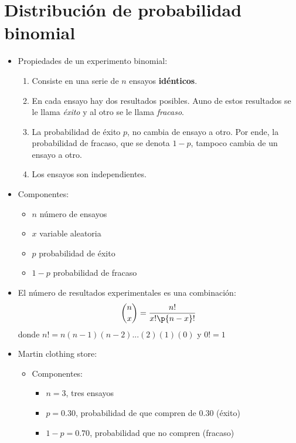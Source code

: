 \documentclass{article}
\begin{document}
\section{Distribución de probabilidad binomial}
\begin{itemize}
    \item Propiedades de un experimento binomial:
        \begin{enumerate}
            \item Consiste en una serie de $n$ ensayos \textbf{idénticos}.
            \item En cada ensayo hay dos resultados posibles. Auno de estos resultados se le llama \emph{éxito} y al otro se le llama \emph{fracaso}.
            \item La probabilidad de éxito $p$, no cambia de ensayo a otro. Por ende, la probabilidad de fracaso, que se denota $1-p$, tampoco cambia de un ensayo a otro. 
            \item Los ensayos son independientes. 
        \end{enumerate}
    
    \item Componentes:
        \begin{itemize}
            \item $n$ número de ensayos 
            \item $x$ variable aleatoria 
            \item $p$ probabilidad de éxito 
            \item $1-p$ probabilidad de fracaso 
        \end{itemize}
    
    \item El número de resultados experimentales es una combinación:
        \[
          \binom{n}{x} = \frac{n!}{x!\p{n-x} !} 
        \] donde $n! = n(n-1)(n-2)...(2)(1)(0)$ y $0!=1$
    
    \item  Martin clothing store:
        \begin{itemize}
            \item Componentes:
                \begin{itemize}
                    \item $n=3$, tres ensayos
                    \item $p=0.30$, probabilidad de que compren de $0.30$ (éxito)
                    \item $1-p=0.70$, probabilidad que no compren (fracaso)
                \end{itemize}
            

\end{itemize}
\end{itemize}
\end{document}

